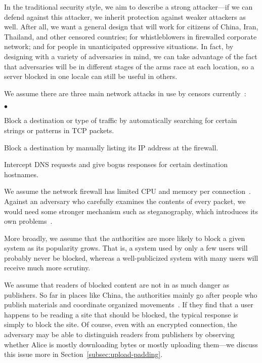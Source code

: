 \documentclass{llncs}
\newenvironment{tightlist}{\begin{list}{$\bullet$}{
  \setlength{\itemsep}{0mm}
    \setlength{\parsep}{0mm}
    }}{\end{list}}
\begin{document}
In the traditional security style, we aim to describe a strong
attacker---if we can defend against this attacker, we inherit protection
against weaker attackers as well. After all, we want a general design
that will work for citizens of China, Iran, Thailand, and other censored
countries; for
whistleblowers in firewalled corporate network; and for people in
unanticipated oppressive situations. In fact, by designing with
a variety of adversaries in mind, we can take advantage of the fact that
adversaries will be in different stages of the arms race at each location,
so a server blocked in one locale can still be useful in others.

We assume there are three main network attacks in use by censors
currently~\cite{clayton:pet2006}:

\begin{tightlist}
\item Block a destination or type of traffic by automatically searching for
  certain strings or patterns in TCP packets.
\item Block a destination by manually listing its IP address at the
firewall.
\item Intercept DNS requests and give bogus responses for certain
destination hostnames.
\end{tightlist}

We assume the network firewall has limited CPU and memory per
connection~\cite{clayton:pet2006}. Against an adversary who carefully
examines the contents of every packet, we would need
some stronger mechanism such as steganography, which introduces its
own problems~\cite{active-wardens,tcpstego,bar}.

More broadly, we assume that the authorities are more likely to
block a given system as its popularity grows. That is, a system
used by only a few users will probably never be blocked, whereas a
well-publicized system with many users will receive much more scrutiny.

We assume that readers of blocked content are not in as much danger
as publishers. So far in places like China, the authorities mainly go
after people who publish materials and coordinate organized
movements~\cite{mackinnon}.
If they find that a user happens
to be reading a site that should be blocked, the typical response is
simply to block the site. Of course, even with an encrypted connection,
the adversary may be able to distinguish readers from publishers by
observing whether Alice is mostly downloading bytes or mostly uploading
them---we discuss this issue more in Section~\ref{subsec:upload-padding}.
\end{document}
